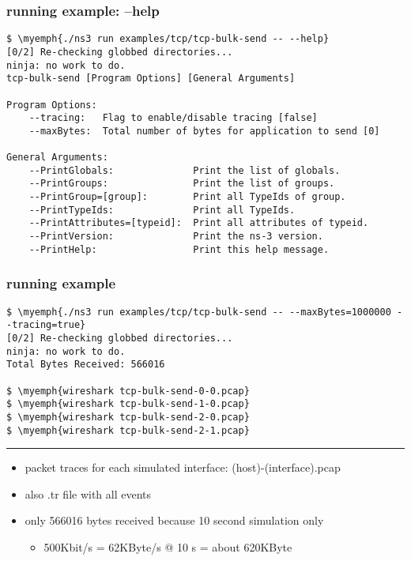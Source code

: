 
\begin{FragileFrame}
\frametitle{running example: --help}
\begin{Verbatim}[fontsize=\fontsize{9}{10},commandchars=\\\{\}]
$ \myemph{./ns3 run examples/tcp/tcp-bulk-send -- --help}
[0/2] Re-checking globbed directories...
ninja: no work to do.
tcp-bulk-send [Program Options] [General Arguments]

Program Options:
    --tracing:   Flag to enable/disable tracing [false]
    --maxBytes:  Total number of bytes for application to send [0]

General Arguments:
    --PrintGlobals:              Print the list of globals.
    --PrintGroups:               Print the list of groups.
    --PrintGroup=[group]:        Print all TypeIds of group.
    --PrintTypeIds:              Print all TypeIds.
    --PrintAttributes=[typeid]:  Print all attributes of typeid.
    --PrintVersion:              Print the ns-3 version.
    --PrintHelp:                 Print this help message.
\end{Verbatim}
\end{FragileFrame}

\begin{FragileFrame}
\frametitle{running example}
\begin{Verbatim}[fontsize=\fontsize{9}{10},commandchars=\\\{\}]
$ \myemph{./ns3 run examples/tcp/tcp-bulk-send -- --maxBytes=1000000 --tracing=true}
[0/2] Re-checking globbed directories...
ninja: no work to do.
Total Bytes Received: 566016

$ \myemph{wireshark tcp-bulk-send-0-0.pcap}
$ \myemph{wireshark tcp-bulk-send-1-0.pcap}
$ \myemph{wireshark tcp-bulk-send-2-0.pcap}
$ \myemph{wireshark tcp-bulk-send-2-1.pcap}
\end{Verbatim}
    \hrule
\begin{itemize}
\item packet traces for each simulated interface: (host)-(interface).pcap
\item also .tr file with all events
\item only 566016 bytes received because 10 second simulation only
    \begin{itemize}
    \item 500Kbit/s = 62KByte/s @ 10 s = about 620KByte
    \end{itemize}
\end{itemize}
\end{FragileFrame}
